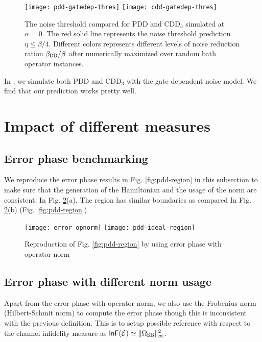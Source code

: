 \documentclass[aps,pra,reprint,superscriptaddress]{revtex4-2}
\begin{document}
 \begin{figure}[htbp]
    \centering
    \texttt{[image: pdd-gatedep-thres]}\quad
    \texttt{[image: cdd-gatedep-thres]}
    \caption{The noise threshold compared for PDD and $\mathrm{CDD}_3$ simulated at $\alpha=0$.
    The red solid line represents the noise threshold prediction $\eta\le\beta/4$. Different colors represents different levels of noise reduction ration $\beta_{\mathsf{DD}}/\beta$ after numerically maximized over random bath operator instances.
    }
    \label{fig:cdd-gatedep-thres}
\end{figure}

In , we simulate both PDD and $\mathrm{CDD}_3$ with the gate-dependent noise model. We find that our prediction works pretty well. 


\section{Impact of different measures}
\subsection{Error phase benchmarking}
We reproduce the error phase results in Fig. \ref{fig:pdd-region} in this subsection to make sure that the generation of the Hamiltonian and the usage of the norm are consistent. In Fig. \ref{fig:pdd-region-check-opnorm}(a), The region has similar boundaries as compared In Fig. \ref{fig:pdd-region-check-opnorm}(b) (Fig. \ref{fig:pdd-region})
\begin{figure}
    \centering
    \texttt{[image: error\_opnorm]}
    \texttt{[image: pdd-ideal-region]}
    \caption{Reproduction of Fig. \ref{fig:pdd-region} by using error phase with operator norm}
    \label{fig:pdd-region-check-opnorm}
\end{figure}

\subsection{Error phase with different norm usage}
Apart from the error phase with operator norm, we also use the Frobenius norm (Hilbert-Schmit norm) to compute the error phase though this is inconsistent with the previous definition. This is to setup possible reference with respect to the channel infidelity measure as $\operatorname{\mathsf{InF}}(\mathcal{E})\simeq \Vert {\Omega_{\mathrm{SB}}} \Vert_\infty^2$. 
\end{document}
